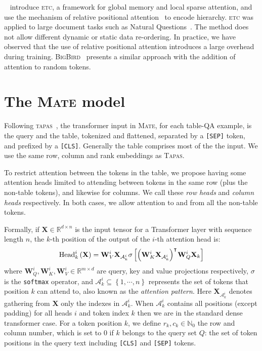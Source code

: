 \documentclass[11pt]{article}
\newcommand{\abr}[1]{\textsc{#1}}
\newcommand{\etc}{\textsc{etc}\xspace}
\newcommand{\bigbird}{\textsc{BigBird}\xspace}
\newcommand{\tapas}{\textsc{Tapas}\xspace}
\newcommand{\model}{\textsc{Mate}\xspace}
\begin{document}
~\citet{ainslie-etal-2020-etc} introduce \etc, a framework for global memory
and local sparse attention, and use the mechanism of relative positional attention~\cite{dai-etal-2019-transformer}
to encode hierarchy.
\etc was applied to large document tasks such as Natural Questions~\cite{kwiatkowski-19}.
The method does not allow different dynamic or static data re-ordering.
In practice, we have observed that the use of relative positional attention
introduces a large overhead during training. 
\bigbird~\cite{zaheer2020bigbird} presents a similar approach with the addition of attention to random tokens. 
 \section{The \model model}
\label{sec:models}

Following \abr{tapas}~\cite{herzig-etal-2020-tapas}, the transformer input in \model, for each table-QA example, is the query and the table, tokenized and flattened, separated by a \texttt{[SEP]} token, and prefixed by a \texttt{[CLS]}. Generally the table comprises most of the the input. We use the same row, column and rank embeddings as \tapas.

To restrict attention between the tokens in the table, we propose having some attention heads limited to attending between tokens in the same row (plus the non-table tokens), and likewise for columns.
We call these \emph{row heads} and \emph{column heads} respectively.
In both cases, we allow attention to and from all the non-table tokens.

Formally, if $\mathbf X\in\mathbb R^{d\times n}$ is the input tensor for a Transformer layer with sequence length $n$, the $k$-th position of the output of the $i$-th attention head is:
\vspace{-1mm}
\[
\text{Head}^i_k\left(\mathbf X\right) = \mathbf W^i_V \mathbf{X}_{\mathcal{A}^i_k}
\sigma\left[
\left(\mathbf{W}^i_K \mathbf{X}_{\mathcal{A}^i_k}\right)^\intercal\mkern-2mu
\mathbf W^i_Q \mathbf X_k
\right]
\vspace{-1mm}
\]
where $\mathbf W^i_Q, \mathbf W^i_K, \mathbf W^i_V \in \mathbb R^{m\times d}$ are query, key and value projections respectively, $\sigma$ is the \texttt{softmax} operator, and $\mathcal{A}^i_k \subseteq \left\{1,\cdots, n\right\}$ represents the set of tokens that position $k$ can attend to, also known as the \emph{attention pattern}. 
Here $\mathbf X_{\mathcal{A}^i_k}$ denotes gathering from $\mathbf X$ only the indexes in $\mathcal{A}^i_k$.
When $\mathcal{A}^i_k$ contains all positions (except padding) for all heads $i$ and token index $k$ then we are in the standard dense transformer case. For a token position $k$, we define $r_k, c_k \in \mathbb N_0$ the row and column number, which is set to $0$ if $k$ belongs to the query set $Q$: the set of token positions in the query text including \texttt{[CLS]} and \texttt{[SEP]} tokens.
\end{document}
